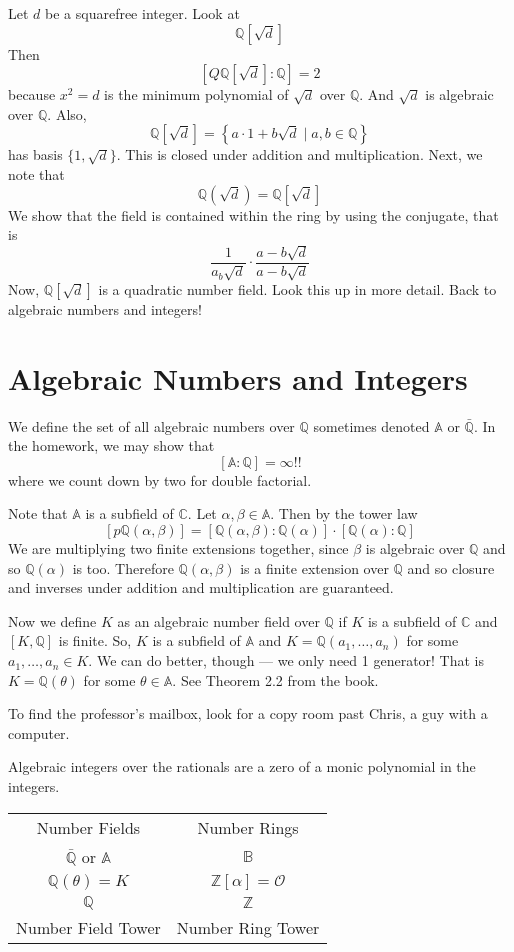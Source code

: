\documentclass{article}
\begin{document}
Let $d$ be a squarefree integer. Look at 
\[ \mathbb{Q}[\sqrt{d}] \]
Then
\[ [ Q\mathbb{Q}[\sqrt{d}] : \mathbb{Q} ] = 2 \]
because $x^2 = d$ is the minimum polynomial of $\sqrt{d}$ over $\mathbb{Q}$.
And $\sqrt{d}$ is algebraic over $\mathbb{Q}$. Also, 
\[ \mathbb{Q}[\sqrt{d}] = \left\{ a \cdot 1 + b \sqrt{d} \mid a,b \in \mathbb{Q}
\right\} \]
has basis $\{1, \sqrt{d}\}$. This is closed under addition and multiplication.
Next, we note that
\[ \mathbb{Q}(\sqrt{d}) = \mathbb{Q}[\sqrt{d}] \]
We show that the field is contained within the ring by using the conjugate, that
is
\[ \frac{1}{a _ b \sqrt{d}} \cdot \frac{ a - b\sqrt{d} }{a - b\sqrt{d} } \]
Now, $\mathbb{Q}[\sqrt{d}]$ is a quadratic number field. Look this up in more
detail. Back to algebraic numbers and integers!

\section{Algebraic Numbers and Integers}
We define the set of all algebraic numbers over $\mathbb{Q}$ sometimes denoted
$\mathbb{A}$ or $\bar{\mathbb{Q}}$. In the homework, we may show that
\[ [ \mathbb{A} : \mathbb{Q} ] = \infty!! \]
where we count down by two for double factorial. 

Note that $\mathbb{A}$ is a subfield of $\mathbb{C}$. Let $\alpha, \beta \in
\mathbb{A}$. Then by the tower law
\[ [p\mathbb{Q}(\alpha, \beta)] =
[\mathbb{Q}(\alpha,\beta):\mathbb{Q}(\alpha)] \cdot [\mathbb{Q}(\alpha) :
\mathbb{Q}] \]
We are multiplying two finite extensions together, since $\beta$ is algebraic
over $\mathbb{Q}$ and so $\mathbb{Q}(\alpha)$ is too. Therefore
$\mathbb{Q}(\alpha, \beta)$ is a finite extension over $\mathbb{Q}$ and so
closure and inverses under addition and multiplication are guaranteed.

Now we define $K$ as an algebraic number field over $\mathbb{Q}$ if $K$ is a
subfield of $\mathbb{C}$ and $[K,\mathbb{Q}]$ is finite. 
So, $K$ is a subfield of $\mathbb{A}$ and $K = \mathbb{Q}(a_1,\ldots,a_n)$ for
some $a_1,\ldots,a_n \in K$. We can do better, though --- we only need 1
generator! That is $K = \mathbb{Q}(\theta)$ for some $\theta \in \mathbb{A}$.
See Theorem 2.2 from the book. 

To find the professor's mailbox, look for a copy room past Chris, a guy with a
computer. 

Algebraic integers over the rationals are a zero of a monic polynomial in the integers.

\begin{tabular}{c|c}
Number Fields & Number Rings \\
$\bar{\mathbb{Q}}$ or $\mathbb{A}$ & $\mathbb{B}$ \\
$\mathbb{Q}(\theta) = K$ & $\mathbb{Z}[\alpha] = \mathcal{O}$ \\
$\mathbb{Q}$ & $\mathbb{Z}$ \\
Number Field Tower & Number Ring Tower\\
\end{tabular}
\end{document}

